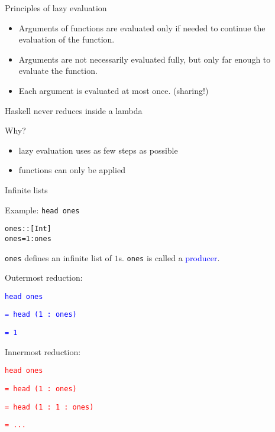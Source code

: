 \documentclass{beamer}
\def\code#1{\texttt{\frenchspacing#1}}
\begin{document}
\begin{frame}{Principles of lazy evaluation}

\begin{itemize}
    \item Arguments of functions are evaluated only if needed to continue the evaluation of the function.\pause
    \item Arguments are not necessarily evaluated fully, but only far enough to evaluate the function.\pause
    \item Each argument is evaluated at most once. (sharing!)
\end{itemize}

\pause

\vspace{1cm}
\begin{alertblock}{\centering Haskell never reduces inside a lambda}
\end{alertblock}

Why?\pause
\begin{itemize}
    \item lazy evaluation uses as few steps as possible
    \item functions can only be applied
\end{itemize}

\end{frame}

\begin{frame}[fragile]{Infinite lists}

\begin{exampleblock}{Example: \code{head ones}}
\begin{alltt}
ones :: [Int]
ones = 1 : ones
\end{alltt}

\code{ones} defines an infinite list of $1$s. \code{ones} is called a \textcolor{blue}{producer}.

\pause

\vspace{0.5cm}
Outermost reduction: \par
\textcolor{blue}{\code{head ones}} \par\pause
\textcolor{blue}{\code{= head (1 : ones)}} \par\pause
\textcolor{blue}{\code{= 1}}

\vspace{0.5cm}
Innermost reduction: \par
\textcolor{red}{\code{head ones}} \par\pause
\textcolor{red}{\code{= head (1 : ones)}} \par\pause
\textcolor{red}{\code{= head (1 : 1 : ones)}} \par
\textcolor{red}{\code{= ...}}
\end{exampleblock}

\end{frame}
\end{document}
